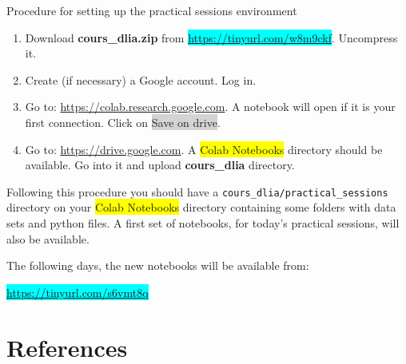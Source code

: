 \documentclass[xcolor=pdftex,dvipsnames,table,mathserif]{beamer}
\begin{document}
\begin{frame}{Procedure for setting up the practical sessions environment}

\scriptsize

    \begin{enumerate}
    \item Download \textbf{cours\_dlia.zip} from \colorbox{cyan}{\url{https://tinyurl.com/w8m9ckf}}. Uncompress it.
    \item Create (if necessary) a Google account. Log in.
    \item Go to: \url{https://colab.research.google.com}. A notebook will open if it is your first connection. Click on \colorbox{lightgray}{Save on drive}.
    \item Go to: \url{https://drive.google.com}. A \colorbox{yellow}{Colab Notebooks} directory should be available. Go into it and upload \textbf{cours\_dlia} directory.
    \end{enumerate}

    Following this procedure you should have a \texttt{cours\_dlia/practical\_sessions} directory on your \colorbox{yellow}{Colab Notebooks} directory containing some folders with data sets and python files. A first set of notebooks, for today's practical sessions, will also be available.

    The following days, the new notebooks will be available from:

    \centering

    \colorbox{cyan}{\url{https://tinyurl.com/s6vmt8q}}


\end{frame}



\section*{References}



\end{document}
